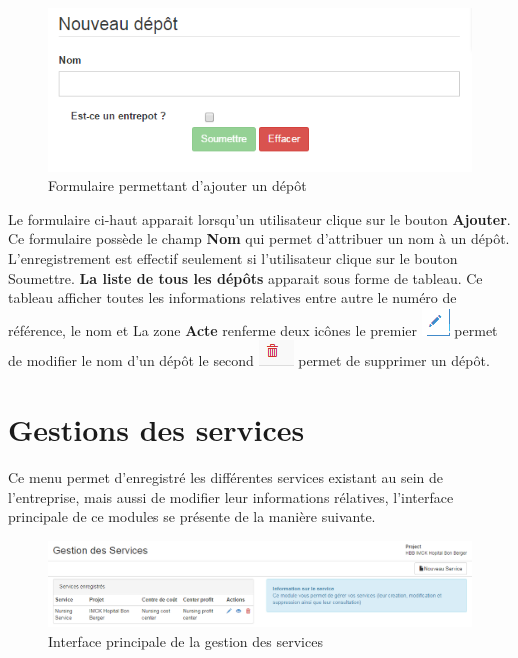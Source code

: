 \documentclass[12pt,a4paper]{report}
\begin{document}
\begin{figure}[h]
\begin{center}
\includegraphics[width=14cm]{pic/NewStore.png}
\end{center}
\caption{Formulaire permettant d'ajouter un dépôt}
\label{Formulaire permettant d'ajouter un dépôt}
\end{figure}

Le formulaire ci-haut apparait lorsqu'un utilisateur clique sur le bouton \textbf{Ajouter}. Ce formulaire possède le champ \textbf{Nom} qui permet d'attribuer un nom à un dépôt.
L'enregistrement est effectif seulement si l'utilisateur clique sur le bouton Soumettre. \textbf{La liste de tous les dépôts} apparait sous forme de tableau. Ce tableau afficher toutes les informations relatives entre autre le numéro de référence, le nom et La zone \textbf{Acte} renferme deux icônes le premier \includegraphics[scale=0.7]{pic/EditUser.png}  permet de modifier le nom d'un dépôt le second \includegraphics[scale=0.7]{pic/DeleteWRed.png}  permet de supprimer un dépôt.
\newpage

\section{Gestions des services}
Ce menu permet d'enregistré les différentes services existant au sein de l'entreprise, mais aussi de modifier leur informations rélatives, l'interface principale de ce modules se présente de la manière suivante.

\begin{figure}[h]
\begin{center}
\includegraphics[width=14cm]{pic/AdminService.png}
\end{center}
\caption{Interface principale de la gestion des services}
\label{Interface principale de la gestion des services}
\end{figure}
\end{document}
